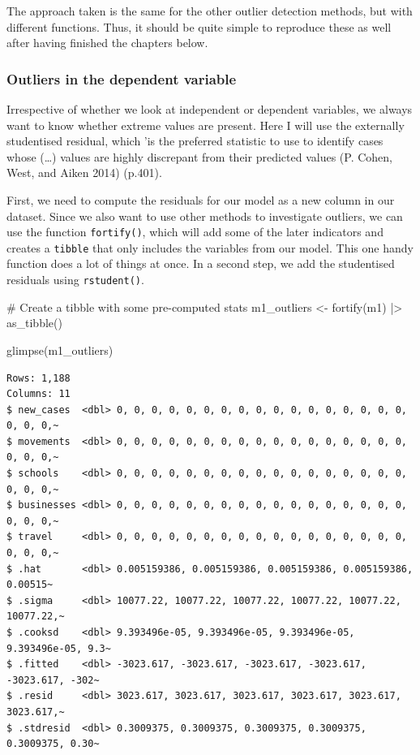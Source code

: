 \documentclass[
  letterpaper,
]{krantz}
\makeatletter
\newenvironment{Shaded}{\begin{snugshade}}{\end{snugshade}}
\newcommand{\CommentTok}[1]{\textcolor[rgb]{0.37,0.37,0.37}{#1}}
\newcommand{\FunctionTok}[1]{\textcolor[rgb]{0.28,0.35,0.67}{#1}}
\newcommand{\NormalTok}[1]{\textcolor[rgb]{0.00,0.23,0.31}{#1}}
\newcommand{\OtherTok}[1]{\textcolor[rgb]{0.00,0.23,0.31}{#1}}
\newcommand{\SpecialCharTok}[1]{\textcolor[rgb]{0.37,0.37,0.37}{#1}}
\newenvironment{kframe}{%
\medskip{}
\setlength{\fboxsep}{.8em}
 \def\at@end@of@kframe{}%
 \ifinner\ifhmode%
  \def\at@end@of@kframe{\end{minipage}}%
  \begin{minipage}{\columnwidth}%
 \fi\fi%
 \def\FrameCommand##1{\hskip\@totalleftmargin \hskip-\fboxsep
 \colorbox{shadecolor}{##1}\hskip-\fboxsep
     \hskip-\linewidth \hskip-\@totalleftmargin \hskip\columnwidth}%
 \MakeFramed {\advance\hsize-\width
   \@totalleftmargin\z@ \linewidth\hsize
   \@setminipage}}%
 {\par\unskip\endMakeFramed%
 \at@end@of@kframe}
\renewenvironment{Shaded}{\begin{kframe}}{\end{kframe}}
\makeatother
\begin{document}
The approach taken is the same for the other outlier detection methods,
but with different functions. Thus, it should be quite simple to
reproduce these as well after having finished the chapters below.

\subsubsection{Outliers in the dependent
variable}\label{sec-outliers-in-the-dependent-variable}

Irrespective of whether we look at independent or dependent variables,
we always want to know whether extreme values are present. Here I will
use the externally studentised residual, which 'is the preferred
statistic to use to identify cases whose (\ldots) values are highly
discrepant from their predicted values (P. Cohen, West, and Aiken 2014)
(p.401).

First, we need to compute the residuals for our model as a new column in
our dataset. Since we also want to use other methods to investigate
outliers, we can use the function \texttt{fortify()}, which will add
some of the later indicators and creates a \texttt{tibble} that only
includes the variables from our model. This one handy function does a
lot of things at once. In a second step, we add the studentised
residuals using \texttt{rstudent()}.

\begin{Shaded}
\begin{Highlighting}[]
\CommentTok{\# Create a tibble with some pre{-}computed stats}
\NormalTok{m1\_outliers }\OtherTok{\textless{}{-}}
  \FunctionTok{fortify}\NormalTok{(m1) }\SpecialCharTok{|\textgreater{}}
  \FunctionTok{as\_tibble}\NormalTok{()}

\FunctionTok{glimpse}\NormalTok{(m1\_outliers)}
\end{Highlighting}
\end{Shaded}

\begin{verbatim}
Rows: 1,188
Columns: 11
$ new_cases  <dbl> 0, 0, 0, 0, 0, 0, 0, 0, 0, 0, 0, 0, 0, 0, 0, 0, 0, 0, 0, 0,~
$ movements  <dbl> 0, 0, 0, 0, 0, 0, 0, 0, 0, 0, 0, 0, 0, 0, 0, 0, 0, 0, 0, 0,~
$ schools    <dbl> 0, 0, 0, 0, 0, 0, 0, 0, 0, 0, 0, 0, 0, 0, 0, 0, 0, 0, 0, 0,~
$ businesses <dbl> 0, 0, 0, 0, 0, 0, 0, 0, 0, 0, 0, 0, 0, 0, 0, 0, 0, 0, 0, 0,~
$ travel     <dbl> 0, 0, 0, 0, 0, 0, 0, 0, 0, 0, 0, 0, 0, 0, 0, 0, 0, 0, 0, 0,~
$ .hat       <dbl> 0.005159386, 0.005159386, 0.005159386, 0.005159386, 0.00515~
$ .sigma     <dbl> 10077.22, 10077.22, 10077.22, 10077.22, 10077.22, 10077.22,~
$ .cooksd    <dbl> 9.393496e-05, 9.393496e-05, 9.393496e-05, 9.393496e-05, 9.3~
$ .fitted    <dbl> -3023.617, -3023.617, -3023.617, -3023.617, -3023.617, -302~
$ .resid     <dbl> 3023.617, 3023.617, 3023.617, 3023.617, 3023.617, 3023.617,~
$ .stdresid  <dbl> 0.3009375, 0.3009375, 0.3009375, 0.3009375, 0.3009375, 0.30~
\end{verbatim}
\end{document}
